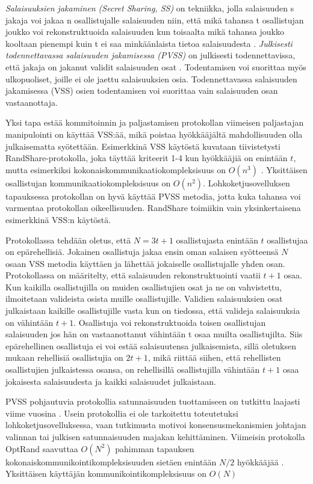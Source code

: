 \textit{Salaisuuksien jakaminen (Secret Sharing, SS)} on tekniikka, jolla salaisuuden s jakaja voi jakaa n osallistujalle salaisuuden niin, että mikä tahansa t osallistujan joukko voi rekonstruktuoida salaisuuden kun toisaalta mikä tahansa joukko kooltaan pienempi kuin t ei saa minkäänlaista tietoa salaisuudesta \cite{shamir_how_1979}. \textit{Julkisesti todennettavassa salaisuuden jakamisessa (PVSS)} on julkisesti todennettavissa, että jakaja on jakanut validit salaisuuden osat \cite{StadlerMarkus2001PVSS}. Todentamisen voi suorittaa myös ulkopuoliset, joille ei ole jaettu salaisuuksien osia. Todennettavassa salaisuuden jakamisessa (VSS) osien todentamisen voi suorittaa vain salaisuuden osan vastaanottaja.

Yksi tapa estää kommitoinnin ja paljastamisen protokollan viimeisen paljastajan manipulointi on käyttää VSS:ää, mikä poistaa hyökkääjältä mahdollisuuden olla julkaisematta syötettään. Esimerkkinä VSS käytöstä kuvataan tiivistetysti RandShare-protokolla, joka täyttää kriteerit 1-4 kun hyökkääjiä on enintään $t$, mutta esimerkiksi kokonaiskommunikaatiokompleksisuus on $O(n^3)$ \cite{syta_scalable_2017}. Yksittäisen osallistujan kommunikaatiokompleksisuus on $O(n^2)$. Lohkoketjusovelluksen tapauksessa protokollan on hyvä käyttää PVSS metodia, jotta kuka tahansa voi varmentaa protokollan oikeellisuuden. RandShare toimiikin vain yksinkertaisena esimerkkinä VSS:n käytöstä.

Protokollassa tehdään oletus, että $N = 3t+1$ osallistujasta enintään $t$ osallistujaa on epärehellisiä. Jokainen osallistuja jakaa ensin oman salaisen syötteensä $N$ osaan VSS metodia käyttäen ja lähettää jokaiselle osallistujalle yhden osan. Protokollassa on määritelty, että salaisuuden rekonstruktuointi vaatii $t+1$ osaa. Kun kaikilla osallistujilla on muiden osallistujien osat ja ne on vahvistettu, ilmoitetaan valideista osista muille osallistujille. Validien salaisuuksien osat julkaistaan kaikille osallistujille vasta kun on tiedossa, että valideja salaisuuksia on vähintään $t+1$. Osallistuja voi rekonstruktuoida toisen osallistujan salaisuuden jos hän on vastaanottanut vähintään t osaa muilta osallistujilta. Siis epärehellinen osallistuja ei voi estää salaisuutensa julkaisemista, sillä oletuksen mukaan rehellisiä osallistujia on $2t+1$, mikä riittää siihen, että rehellisten osallistujien julkaistessa osansa, on rehellisillä osallistujilla vähintään $t+1$ osaa jokaisesta salaisuudesta ja kaikki salaisuudet julkaistaan.

PVSS pohjautuvia protokollia satunnaisuuden tuottamiseen on tutkittu laajasti viime vuosina \cite{bhat2022optrand, bhat2021randpiper, schindler_hydrand_2020, syta_scalable_2017} . Usein protokollia ei ole tarkoitettu toteutetuksi lohkoketjusovelluksessa, vaan tutkimusta motivoi konsensusmekanismien johtajan valinnan tai julkisen satunnaisuuden majakan kehittäminen. Viimeisin protokolla OptRand saavuttaa $O(N^2)$ pahimman tapauksen kokonaiskommunikointikompleksisuuden sietäen enintään $N/2$ hyökkääjää \cite{bhat2022optrand}. Yksittäisen käyttäjän kommunikointikompleksisuus on $O(N)$

